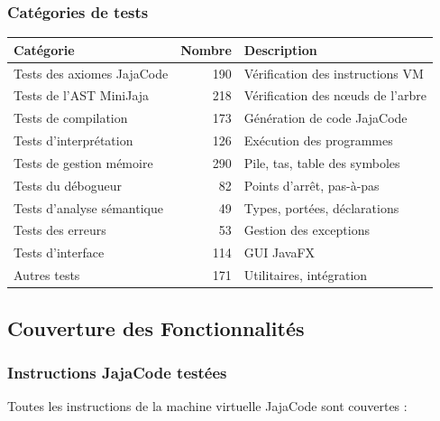 \subsubsection{Catégories de tests}

\begin{center}
\begin{tabular}{|l|r|l|}
\hline
\rowcolor{headerblue!20}
\textbf{Catégorie} & \textbf{Nombre} & \textbf{Description} \\
\hline
Tests des axiomes JajaCode & 190 & Vérification des instructions VM \\
\hline
Tests de l'AST MiniJaja & 218 & Vérification des nœuds de l'arbre \\
\hline
Tests de compilation & 173 & Génération de code JajaCode \\
\hline
Tests d'interprétation & 126 & Exécution des programmes \\
\hline
Tests de gestion mémoire & 290 & Pile, tas, table des symboles \\
\hline
Tests du débogueur & 82 & Points d'arrêt, pas-à-pas \\
\hline
Tests d'analyse sémantique & 49 & Types, portées, déclarations \\
\hline
Tests des erreurs & 53 & Gestion des exceptions \\
\hline
Tests d'interface & 114 & GUI JavaFX \\
\hline
Autres tests & 171 & Utilitaires, intégration \\
\hline
\end{tabular}
\end{center}

\subsection{Couverture des Fonctionnalités}

\subsubsection{Instructions JajaCode testées}

Toutes les instructions de la machine virtuelle JajaCode sont couvertes :

